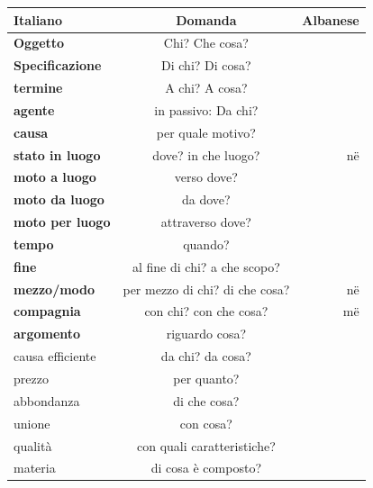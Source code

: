 \begin{table}[ht]
    \centering
    \begin{tabular}{lcr}
        \toprule
        Italiano            & Domanda                   & Albanese \\
        \midrule
        \textbf{Oggetto}              & Chi? Che cosa?               &\\
        \textbf{Specificazione}      & Di chi? Di cosa?              &\\
        \textbf{termine}             & A chi? A cosa?                &\\
        \textbf{agente}              & in passivo: Da chi?           &\\
        \textbf{causa}               & per quale motivo?             &\\
        \textbf{stato in luogo}      & dove? in che luogo?           & në\\
        \textbf{moto a luogo}        & verso dove?                   &\\
        \textbf{moto da luogo}       & da dove?                      &\\
        \textbf{moto per luogo}      & attraverso dove?              &\\
        \textbf{tempo}               & quando?                       &\\
        \textbf{fine}                & al fine di chi? a che scopo?  &\\
        \textbf{mezzo/modo}          & per mezzo di chi? di che cosa?& në\\
        \textbf{compagnia}           & con chi? con che cosa?        & më\\
        \textbf{argomento}           & riguardo cosa?                &\\
        causa efficiente    & da chi? da cosa?              &\\
        prezzo              & per quanto?                   &\\
        abbondanza          & di che cosa?                  &\\
        unione              & con cosa?                     &\\
        qualità             & con quali caratteristiche?    &\\
        materia             & di cosa è composto?           &\\
        

\end{tabular}
\end{table}

